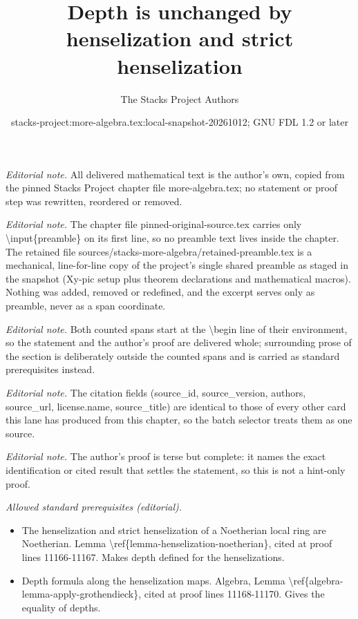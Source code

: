 \documentclass[10pt,a4paper]{amsart}
\title{Depth is unchanged by henselization and strict henselization}
\author{The Stacks Project Authors}
\date{stacks-project:more-algebra.tex:local-snapshot-20261012; GNU FDL 1.2 or later}
\theoremstyle{plain}
\theoremstyle{definition}
\theoremstyle{remark}
\numberwithin{equation}{subsection}
\begin{document}
\maketitle
\setcounter{subsection}{1}
\noindent\textit{Editorial note.} All delivered mathematical text is the author's own, copied from the pinned Stacks Project chapter file more-algebra.tex; no statement or proof step was rewritten, reordered or removed.\par\medskip
\noindent\textit{Editorial note.} The chapter file pinned-original-source.tex carries only \textbackslash{}input\{preamble\} on its first line, so no preamble text lives inside the chapter. The retained file sources/stacks-more-algebra/retained-preamble.tex is a mechanical, line-for-line copy of the project's single shared preamble as staged in the snapshot (Xy-pic setup plus theorem declarations and mathematical macros). Nothing was added, removed or redefined, and the excerpt serves only as preamble, never as a span coordinate.\par\medskip
\noindent\textit{Editorial note.} Both counted spans start at the \textbackslash{}begin line of their environment, so the statement and the author's proof are delivered whole; surrounding prose of the section is deliberately outside the counted spans and is carried as standard prerequisites instead.\par\medskip
\noindent\textit{Editorial note.} The citation fields (source\_id, source\_version, authors, source\_url, license.name, source\_title) are identical to those of every other card this lane has produced from this chapter, so the batch selector treats them as one source.\par\medskip
\noindent\textit{Editorial note.} The author's proof is terse but complete: it names the exact identification or cited result that settles the statement, so this is not a hint-only proof.\par\medskip
\noindent\textit{Allowed standard prerequisites (editorial).}\begin{itemize}
\item The henselization and strict henselization of a Noetherian local ring are Noetherian. Lemma \textbackslash{}ref\{lemma-henselization-noetherian\}, cited at proof lines 11166-11167. Makes depth defined for the henselizations.
\item Depth formula along the henselization maps. Algebra, Lemma \textbackslash{}ref\{algebra-lemma-apply-grothendieck\}, cited at proof lines 11168-11170. Gives the equality of depths.
\end{itemize}\medskip
\end{document}
